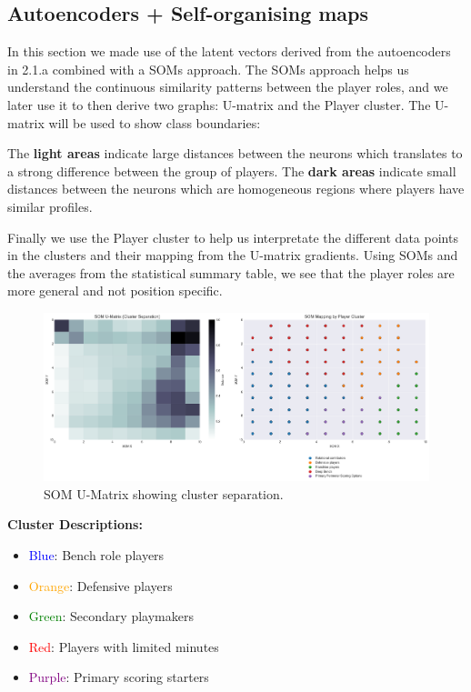 \documentclass{article}
\begin{document}
\subsection{Autoencoders + Self-organising maps}

In this section we made use of the latent vectors derived from the autoencoders in 2.1.a combined with a SOMs approach.
The SOMs approach helps us understand the continuous similarity patterns between the player roles, and we later use it to then derive two graphs: U-matrix and the Player cluster. The U-matrix will be used to show class boundaries:

The {\bf light areas} indicate large distances between the neurons which translates to a strong difference between the group of players.
The {\bf dark areas} indicate small distances between the neurons which are homogeneous regions where players have similar profiles.

Finally we use the Player cluster to help us interpretate the different data points in the clusters and their mapping from the U-matrix gradients. Using SOMs and the averages from the statistical summary table, we see that the player roles are more general and not position specific.

\begin{figure}[h]
    \centering
    \includegraphics[width=0.7\linewidth]{media/2b.png}
    \caption{SOM U-Matrix showing cluster separation.}
\end{figure}

{\bf Cluster Descriptions:}
\begin{itemize}
    \item \textcolor{blue}{Blue}: Bench role players
    \item \textcolor{orange}{Orange}: Defensive players
    \item \textcolor{green}{Green}: Secondary playmakers
    \item \textcolor{red}{Red}: Players with limited minutes
    \item \textcolor{purple}{Purple}: Primary scoring starters
\end{itemize}
\end{document}
